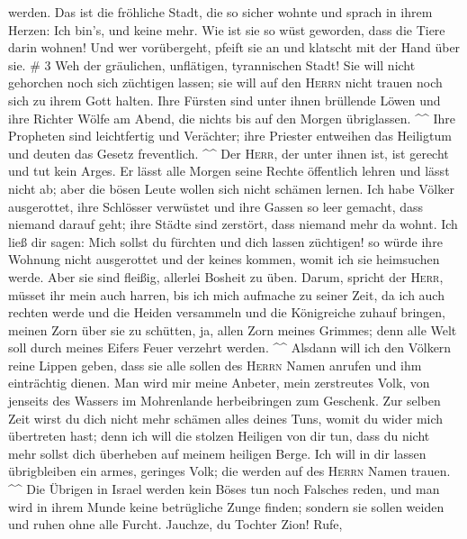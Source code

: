 werden.  Das ist die fröhliche Stadt, die so sicher
wohnte und sprach in ihrem Herzen: Ich bin's, und keine mehr. Wie ist
sie so wüst geworden, dass die Tiere darin wohnen! Und wer vorübergeht,
pfeift sie an und klatscht mit der Hand über sie. \# 3 
Weh der gräulichen, unflätigen, tyrannischen Stadt!  Sie
will nicht gehorchen noch sich züchtigen lassen; sie will auf den
\textsc{Herrn} nicht trauen noch sich zu ihrem Gott halten.
 Ihre Fürsten sind unter ihnen brüllende Löwen und ihre
Richter Wölfe am Abend, die nichts bis auf den Morgen übriglassen.
\^{}\^{}  Ihre Propheten sind leichtfertig und Verächter;
ihre Priester entweihen das Heiligtum und deuten das Gesetz freventlich.
\^{}\^{}  Der \textsc{Herr}, der unter ihnen ist, ist
gerecht und tut kein Arges. Er lässt alle Morgen seine Rechte öffentlich
lehren und lässt nicht ab; aber die bösen Leute wollen sich nicht
schämen lernen.  Ich habe Völker ausgerottet, ihre
Schlösser verwüstet und ihre Gassen so leer gemacht, dass niemand darauf
geht; ihre Städte sind zerstört, dass niemand mehr da wohnt.
 Ich ließ dir sagen: Mich sollst du fürchten und dich
lassen züchtigen! so würde ihre Wohnung nicht ausgerottet und der keines
kommen, womit ich sie heimsuchen werde. Aber sie sind fleißig, allerlei
Bosheit zu üben.  Darum, spricht der \textsc{Herr}, müsset
ihr mein auch harren, bis ich mich aufmache zu seiner Zeit, da ich auch
rechten werde und die Heiden versammeln und die Königreiche zuhauf
bringen, meinen Zorn über sie zu schütten, ja, allen Zorn meines
Grimmes; denn alle Welt soll durch meines Eifers Feuer verzehrt werden.
\^{}\^{}  Alsdann will ich den Völkern reine Lippen geben,
dass sie alle sollen des \textsc{Herrn} Namen anrufen und ihm
einträchtig dienen.  Man wird mir meine Anbeter, mein
zerstreutes Volk, von jenseits des Wassers im Mohrenlande herbeibringen
zum Geschenk.  Zur selben Zeit wirst du dich nicht mehr
schämen alles deines Tuns, womit du wider mich übertreten hast; denn ich
will die stolzen Heiligen von dir tun, dass du nicht mehr sollst dich
überheben auf meinem heiligen Berge.  Ich will in dir
lassen übrigbleiben ein armes, geringes Volk; die werden auf des
\textsc{Herrn} Namen trauen. \^{}\^{}  Die Übrigen in
Israel werden kein Böses tun noch Falsches reden, und man wird in ihrem
Munde keine betrügliche Zunge finden; sondern sie sollen weiden und
ruhen ohne alle Furcht.  Jauchze, du Tochter Zion! Rufe,
